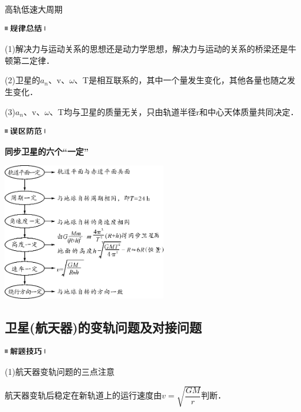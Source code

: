 高轨低速大周期

\begin{center}\includegraphics[width=0.71667in,height=0.13333in]{media/image44.png}\end{center}

(1)解决力与运动关系的思想还是动力学思想，解决力与运动的关系的桥梁还是牛顿第二定律．

(2)卫星的$a_n$、v、$\omega$、T是相互联系的，其中一个量发生变化，其他各量也随之发生变化．

(3)$a_n$、v、$\omega$、T均与卫星的质量无关，只由轨道半径r和中心天体质量共同决定．

\begin{center}\includegraphics[width=0.71667in,height=0.13333in]{media/image34.png}

\textbf{同步卫星的六个``一定''}
\end{center}


\begin{center}\includegraphics[width=2.8in,height=2.35in]{media/image201.png}\end{center}
\newpage
\subsection{卫星(航天器)的变轨问题及对接问题}

\begin{center}\includegraphics[width=0.71667in,height=0.13333in]{media/image37.png}\end{center}

(1)航天器变轨问题的三点注意

航天器变轨后稳定在新轨道上的运行速度由$v=\sqrt{\dfrac{G M}{r}}$判断．

